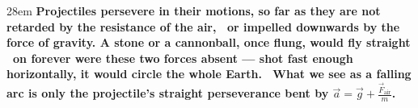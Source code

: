 \documentclass[border=4pt]{standalone}
\begin{document}
\begin{varwidth}{28em}
\large\bfseries
\textcolor{proj}{Projectiles} persevere in their motions, so far as they are not retarded by the \textcolor{resist}{resistance of the air}, \     or impelled downwards by the \textcolor{gravity}{force of gravity}. A stone or a cannonball, once flung, would fly straight \     on forever were these two forces absent — shot fast enough horizontally, it would circle the whole Earth. \     What we see as a falling arc is only the \textcolor{proj}{projectile's} straight perseverance bent by $\vec{a} = \vec{g} + \tfrac{\vec{F}_{\text{air}}}{m}$.
\end{varwidth}
\end{document}

